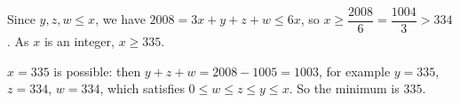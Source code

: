 Since $y,z,w\le x$, we have $2008=3x+y+z+w\le6x$, so $x\ge\dfrac{2008}{6}=\dfrac{1004}{3}>334$. As $x$ is an integer, $x\ge335$.

$x=335$ is possible: then $y+z+w=2008-1005=1003$, for example $y=335$, $z=334$, $w=334$, which satisfies $0\le w\le z\le y\le x$. So the minimum is $\boxed{335}$.

